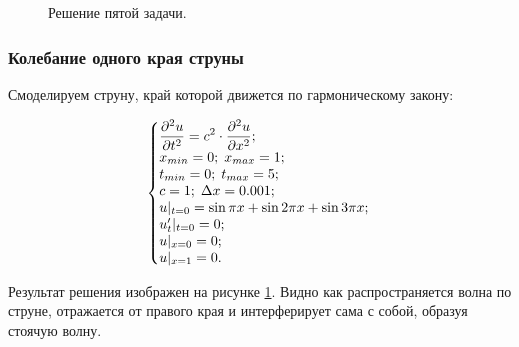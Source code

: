 \documentclass[12pt,a4paper,russian]{report}
\begin{document}
	\begin{figure}[h]
		\caption{Решение пятой задачи.}
		\label{img:fifth_task}
	\end{figure}
	
	\newpage
	\subsubsection{Колебание одного края струны}
	
	Смоделируем струну, край которой движется по гармоническому закону:
	
	\begin{equation*}
		\left\{\begin{array}{@{}l@{}}
			\displaystyle \frac{\partial^2u}{\partial t^2} = c^2 \cdot \frac{\partial^2u}{\partial x^2}; \\
			x_{min} = 0; \; x_{max} = 1; \\
			t_{min} = 0; \; t_{max} = 5; \\
			c = 1; \;  \Delta x = 0.001; \\
			u|_{t=0} = \sin \pi x + \sin 2 \pi x + \sin 3 \pi x; \\
			u'_{t}|_{t=0} = 0; \\
			u|_{x=0} = 0; \\
			u|_{x=1} = 0.
		\end{array}\right.\,
	\end{equation*}
	
	Результат решения изображен на рисунке \ref{img:fifth_task}. Видно как распространяется волна по струне, отражается от правого края и интерферирует сама с собой, образуя стоячую волну.
	
\end{document}
